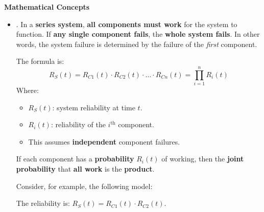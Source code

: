 \highspace
\begin{flushleft}
    \textcolor{Green3}{ \textbf{Mathematical Concepts}}
\end{flushleft}
\begin{itemize}
    \item {}. In a \textbf{series system}, \textbf{all components must work} for the system to function. If \textbf{any single component fails}, the \textbf{whole system fails}. In other words, the system failure is determined by the failure of the \emph{first} component.

    The formula is:
    \begin{equation}\label{eq: system fails when the last component fails - sequential}
        R_S(t) = R_{C1}(t) \cdot R_{C2}(t) \cdot \dots \cdot R_{Cn}(t) = \prod_{i=1}^{n} R_i(t)
    \end{equation}
    Where:
    \begin{itemize}
        \item $R_S(t)$: system reliability at time $t$.
        \item $R_i(t)$: reliability of the $i^\text{th}$ component.
        \item This assumes \textbf{independent} component failures.
    \end{itemize}
    If each component has a \textbf{probability} $R_i(t)$ of working, then the \textbf{joint probability} that \textbf{all work} is the \textbf{product}.

    \begin{examplebox}
        Consider, for example, the following model:
        \begin{center}
        \end{center}
        The reliability is: $R_{S}(t) = R_{C1}(t) \cdot R_{C2}(t)$.
    \end{examplebox}



\end{itemize}
